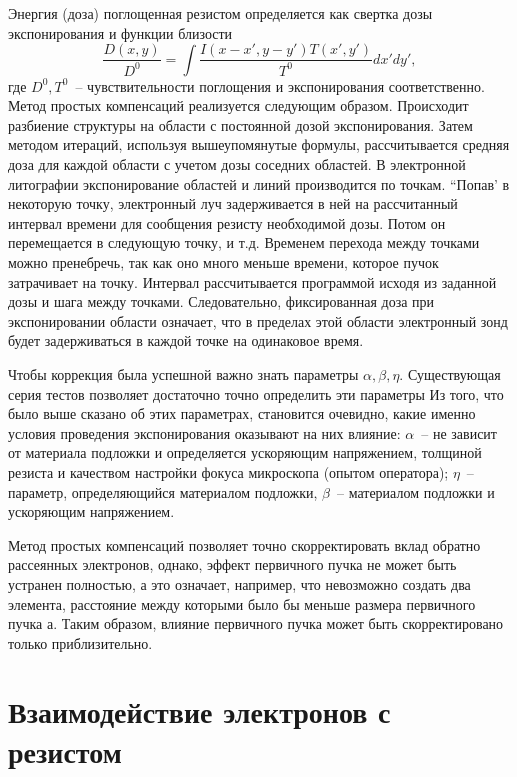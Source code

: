 Энергия (доза) поглощенная резистом определяется как свертка дозы экспонирования и функции близости
\begin{equation}
\frac{D(x,y)}{D^0}= \int \frac{I(x-x',y-y')T(x',y')}{T^0} dx' dy',
\label{eq:A9}
\end{equation}
где $D^0,T^0$~-- чувствительности поглощения и экспонирования соответственно.
Метод простых компенсаций реализуется следующим образом. Происходит разбиение структуры на области с постоянной дозой экспонирования. Затем методом итераций, используя вышеупомянутые формулы, рассчитывается средняя доза для каждой области с учетом дозы соседних областей. В электронной литографии экспонирование областей и линий производится по точкам. “Попав’ в некоторую точку, электронный луч задерживается в ней на рассчитанный интервал времени для сообщения резисту необходимой дозы. Потом он перемещается в следующую точку, и т.д. Временем перехода между точками можно пренебречь, так как оно много меньше времени, которое пучок затрачивает на точку. Интервал рассчитывается программой исходя из заданной дозы и шага между точками. Следовательно, фиксированная доза при экспонировании области означает, что в пределах этой области электронный зонд будет задерживаться в каждой точке на одинаковое время.

Чтобы коррекция была успешной важно знать параметры $\alpha,\beta,\eta$. Существующая серия тестов позволяет достаточно точно определить эти параметры Из того, что было выше сказано об этих параметрах, становится очевидно, какие именно условия проведения экспонирования оказывают на них влияние: $\alpha$~-- не зависит от материала подложки и определяется ускоряющим напряжением, толщиной резиста и качеством настройки фокуса микроскопа (опытом оператора); $\eta$~-- параметр, определяющийся материалом подложки, $\beta$~-- материалом подложки и ускоряющим напряжением.

Метод простых компенсаций позволяет точно скорректировать вклад обратно рассеянных электронов, однако, эффект первичного пучка не может быть устранен полностью, а это означает, например, что невозможно создать два элемента, расстояние между которыми было бы меньше размера первичного пучка а. Таким образом, влияние первичного пучка может быть скорректировано только приблизительно.

\section{Взаимодействие электронов с резистом}

